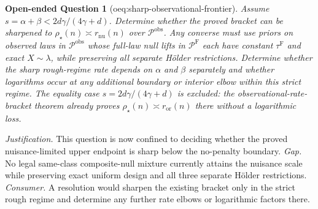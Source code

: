 \documentclass{article}
\newtheorem{openendedquestion}{Open-ended Question}
\begin{document}
\begin{openendedquestion}[oeq:sharp-observational-frontier]\label{oeq:sharp-observational-frontier}
Assume \(s=\alpha+\beta<2d\gamma/(4\gamma+d)\). Determine whether the proved bracket can be sharpened to \(\rho_\star(n)\asymp r_{\mathrm{nu}}(n)\) over \(\mathcal P^{\mathrm{obs}}\). Any converse must use priors on observed laws in \(\mathcal P^{\mathrm{obs}}\) whose full-law null lifts in \(\mathcal P^{\mathrm F}\) each have constant \(\tau^{\mathrm F}\) and exact \(X\sim\lambda\), while preserving all separate Hölder restrictions. Determine whether the sharp rough-regime rate depends on \(\alpha\) and \(\beta\) separately and whether logarithms occur at any additional boundary or interior elbow within this strict regime. The equality case \(s=2d\gamma/(4\gamma+d)\) is excluded: the observational-rate-bracket theorem already proves \(\rho_\star(n)\asymp r_{\mathrm{or}}(n)\) there without a logarithmic loss.
\end{openendedquestion}
\par\smallskip\noindent \textit{Justification.} This question is now confined to deciding whether the proved nuisance-limited upper endpoint is sharp below the no-penalty boundary. \textit{Gap.} No legal same-class composite-null mixture currently attains the nuisance scale while preserving exact uniform design and all three separate Hölder restrictions. \textit{Consumer.} A resolution would sharpen the existing bracket only in the strict rough regime and determine any further rate elbows or logarithmic factors there.
\end{document}
